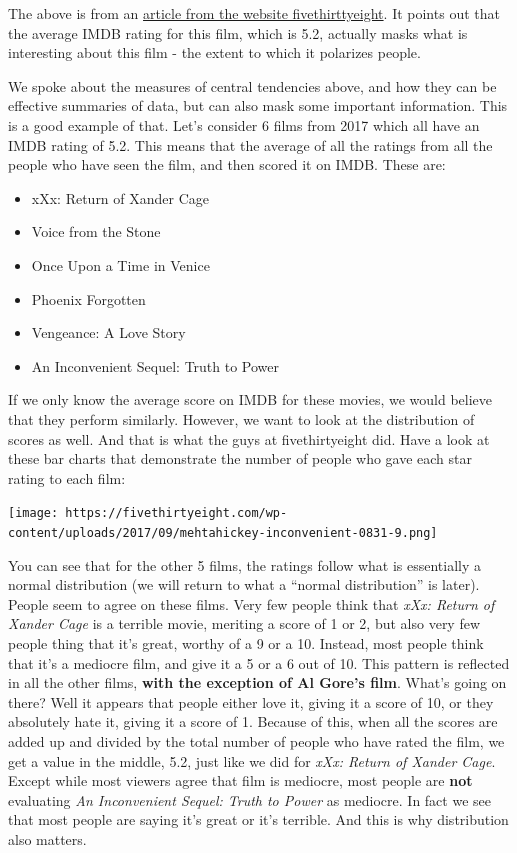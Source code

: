 \documentclass[
]{book}
\providecommand{\tightlist}{%
  \setlength{\itemsep}{0pt}\setlength{\parskip}{0pt}}
\begin{document}
The above is from an \href{https://fivethirtyeight.com/features/al-gores-new-movie-exposes-the-big-flaw-in-online-movie-ratings/}{article from the website fivethirttyeight}. It points out that the average IMDB rating for this film, which is 5.2, actually masks what is interesting about this film - the extent to which it polarizes people.

We spoke about the measures of central tendencies above, and how they can be effective summaries of data, but can also mask some important information. This is a good example of that. Let's consider 6 films from 2017 which all have an IMDB rating of 5.2. This means that the average of all the ratings from all the people who have seen the film, and then scored it on IMDB. These are:

\begin{itemize}
\tightlist
\item
  xXx: Return of Xander Cage
\item
  Voice from the Stone
\item
  Once Upon a Time in Venice
\item
  Phoenix Forgotten
\item
  Vengeance: A Love Story
\item
  An Inconvenient Sequel: Truth to Power
\end{itemize}

If we only know the average score on IMDB for these movies, we would believe that they perform similarly. However, we want to look at the distribution of scores as well. And that is what the guys at fivethirtyeight did. Have a look at these bar charts that demonstrate the number of people who gave each star rating to each film:

\texttt{[image: https://fivethirtyeight.com/wp-content/uploads/2017/09/mehtahickey-inconvenient-0831-9.png]}

You can see that for the other 5 films, the ratings follow what is essentially a normal distribution (we will return to what a ``normal distribution'' is later). People seem to agree on these films. Very few people think that \emph{xXx: Return of Xander Cage} is a terrible movie, meriting a score of 1 or 2, but also very few people thing that it's great, worthy of a 9 or a 10. Instead, most people think that it's a mediocre film, and give it a 5 or a 6 out of 10. This pattern is reflected in all the other films, \textbf{with the exception of Al Gore's film}. What's going on there? Well it appears that people either love it, giving it a score of 10, or they absolutely hate it, giving it a score of 1. Because of this, when all the scores are added up and divided by the total number of people who have rated the film, we get a value in the middle, 5.2, just like we did for \emph{xXx: Return of Xander Cage}. Except while most viewers agree that film is mediocre, most people are \textbf{not} evaluating \emph{An Inconvenient Sequel: Truth to Power} as mediocre. In fact we see that most people are saying it's great or it's terrible. And this is why distribution also matters.
\end{document}
